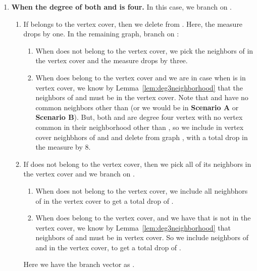 \documentclass[svgnames]{llncs}
\begin{document}
{\begin{enumerate}[series=scenarioC,label=\bfseries Case~\arabic*:]
\item {\bf When the degree of both  and  is four.}
In this case, we branch on . 
\begin{enumerate}
\item If  belongs to the vertex cover, then we delete  from . Here, the measure drops by one. In the remaining graph, branch on :
\begin{enumerate}
\item When  does not belong to the vertex cover, we pick the neighbors of  in the vertex cover and the measure drops by three. 
\item When  does belong to the vertex cover and we are in case when  is in vertex cover, we know by Lemma~\ref{lem:deg3neighborhood} that the neighbors of  and  must be in the vertex cover. 
 Note that  and  have no common neighbors other than  (or we would be in {\bf Scenario A} or {\bf Scenario B}). 
But, both  and  are degree four vertex with no vertex common in their neighborhood other than , so we include in vertex cover neighbhors of  and  and delete from graph ,
with a total drop in the measure by 8.
\end{enumerate}    
\item If  does not belong to the vertex cover, then we pick all of its neighbors in the vertex cover and we branch on .
\begin{enumerate}
 \item When  does not belong to the vertex cover, we include all neighbhors of  in the vertex cover to get a total drop of .
 \item When  does belong to the vertex cover, and we have that  is not in the vertex cover, we know by Lemma~\ref{lem:deg3neighborhood} that neighbors of  and  must be in vertex cover. So we include
 neighbors of  and  in the vertex cover, to get a total drop of .
\end{enumerate}

Here we have the branch vector as .
\end{enumerate}


\end{enumerate}


}
\end{document}
